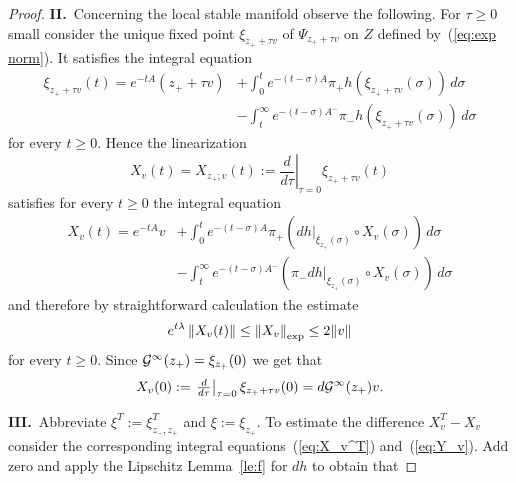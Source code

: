 \documentclass{article}
\begin{document}
\begin{proof}
{\bf II.}~Concerning the local stable manifold
observe the
following. For $\tau\ge0$ small consider the
unique fixed point $\xi_{z_++\tau v}$ of
$\Psi_{z_++\tau v}$ on $Z$ defined
by~(\ref{eq:exp norm}). It satisfies the
integral equation
\begin{equation}\label{eq:eta-tau}
\begin{split}
     \xi_{z_++\tau v} (t)
     =e^{-tA}\left(z_++\tau v\right)
    &+\int_0^t e^{-(t-\sigma)A}\pi_+
     h(\xi_{z_++\tau v} (\sigma))\, d\sigma\\
    &-\int_t^\infty e^{-(t-\sigma)A^-}
     \pi_- h(\xi_{z_++\tau v} (\sigma))\, d\sigma
\end{split}
\end{equation}
for every $t\ge 0$. Hence the linearization
$$
     X_v(t)=X_{z_+;v}(t)
     :=\left.\frac{d}{d\tau}\right|_{\tau=0}
     \xi_{z_++\tau v}(t)
$$
satisfies for every $t\ge 0$ the integral equation
\begin{equation}\label{eq:Y_v}
\begin{split}
     X_v(t)
     =e^{-tA} v
    &+\int_0^t e^{-(t-\sigma)A}\pi_+
     \left( dh|_{\xi_{z_+}(\sigma)}\circ
     X_v(\sigma)\right)\, d\sigma\\
    &-\int_t^\infty e^{-(t-\sigma)A^-}
     \left(\pi_- dh|_{\xi_{z_+}(\sigma)}\circ
     X_v(\sigma)\right)\, d\sigma
\end{split}
\end{equation}
and therefore by straightforward calculation
the estimate
\begin{equation}\label{eq:Y-exp}
     e^{t\lambda} \Norm{X_v(t)}
     \le\Norm{X_v}_{\exp}
     \le 2\norm{v}
\end{equation}
for every $t\ge 0$. Since ${\mathcal{G}}^\infty(z_+)=\xi_{z_+}(0)$ we get that
\begin{equation}\label{eq:Y_v=dG}
     X_v(0)
     :=\left.\tfrac{d}{d\tau}\right|_{\tau=0}
     \xi_{z_++\tau v}(0)
     =d\Gg^\infty(z_+) v.
\end{equation}

{\bf III.}~Abbreviate $\xi^T:=\xi^T_{{z_-},z_+}$ and
$\xi:=\xi_{z_+}$. To estimate the difference
$X^T_v-X_v$ consider the corresponding integral
equations~(\ref{eq:X_v^T}) and~(\ref{eq:Y_v}).
Add zero and apply the Lipschitz Lemma~\ref{le:f}
for $dh$ to obtain that


\end{proof}
\end{document}
